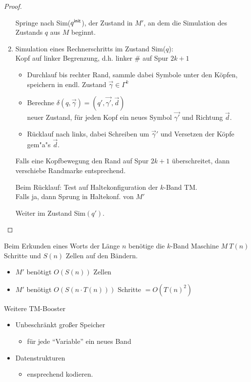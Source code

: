 \begin{proof}
\begin{enumerate}
	Springe nach Sim($q^\mathsf{init}$), der Zustand in $M'$, an dem die Simulation des Zustands $q$ aus $M$ beginnt.
	
	\item Simulation eines Rechnerschritts im Zustand Sim($q$):\\
	Kopf auf linker Begrenzung, d.h. linker \# auf Spur $2k+1$
	\begin{itemize}
		\item Durchlauf bis rechter Rand, sammle dabei Symbole unter den Köpfen, speichern in endl. Zustand $\overrightarrow{\gamma} \in \Gamma^k$
		\item Berechne $\delta(q,\overrightarrow{\gamma})=(q',\overrightarrow{\gamma'},\overrightarrow{d})$\\
		neuer Zustand, für jeden Kopf ein neues Symbol $\overrightarrow{\gamma'}$ und Richtung $\overrightarrow{d}$.
		\item Rücklauf nach links, dabei Schreiben um $\overrightarrow{\gamma}'$ und Versetzen der Köpfe gem"a"s $\overrightarrow{d}$.
	\end{itemize}
	Falls eine Kopfbewegung den Rand auf Spur $2k+1$ überschreitet, dann verschiebe Randmarke entsprechend.
	
	Beim Rücklauf: Test auf Haltekonfiguration der $k$-Band \ac{TM}.\\
	Falls ja, dann Sprung in Haltekonf. von $M'$
	
	Weiter im Zustand Sim$(q')$.
	\end{enumerate}
\end{proof}

\begin{Korollar*}
	Beim Erkunden eines Worts der Länge $n$ benötige die $k$-Band Maschine $M\ T(n)$ Schritte und $S(n)$ Zellen auf den Bändern.
	\begin{itemize}
		\item $M'$ benötigt $O(S(n))$ Zellen
		\item $M'$ benötigt $O(S(n\cdot T(n)))$ Schritte $=O(T(n)^2)$
	\end{itemize}
	Weitere \ac{TM}-Booster
	\begin{itemize}
		\item Unbeschränkt großer Speicher
		\begin{itemize}[label=\->]
			\item für jede "`Variable"' ein neues Band
	\end{itemize}
	\item Datenstrukturen
	\begin{itemize}[label={}]
		\item ensprechend kodieren.
	\end{itemize}
	\end{itemize}
\end{Korollar*}

